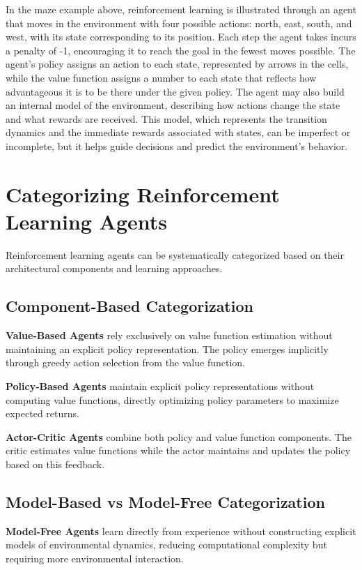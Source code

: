     In the maze example above, reinforcement learning is illustrated through an agent that moves in the environment with four possible actions: north, east, south, and west, with its state corresponding to its position. Each step the agent takes incurs a penalty of -1, encouraging it to reach the goal in the fewest moves possible. The agent’s policy assigns an action to each state, represented by arrows in the cells, while the value function assigns a number to each state that reflects how advantageous it is to be there under the given policy. The agent may also build an internal model of the environment, describing how actions change the state and what rewards are received. This model, which represents the transition dynamics and the immediate rewards associated with states, can be imperfect or incomplete, but it helps guide decisions and predict the environment’s behavior.


\section{Categorizing Reinforcement Learning Agents}


    Reinforcement learning agents can be systematically categorized based on their architectural components and learning approaches.


\subsection{Component-Based Categorization}

    \textbf{Value-Based Agents} rely exclusively on value function estimation without maintaining an explicit policy representation. The policy emerges implicitly through greedy action selection from the value function.
    
    \textbf{Policy-Based Agents} maintain explicit policy representations without computing value functions, directly optimizing policy parameters to maximize expected returns.
    
    \textbf{Actor-Critic Agents} combine both policy and value function components. The critic estimates value functions while the actor maintains and updates the policy based on this feedback.


\subsection{Model-Based vs Model-Free Categorization}

    \textbf{Model-Free Agents} learn directly from experience without constructing explicit models of environmental dynamics, reducing computational complexity but requiring more environmental interaction.
    
